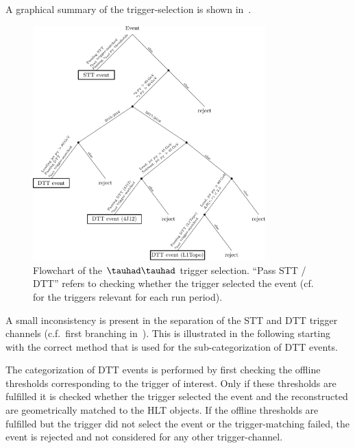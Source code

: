 A graphical summary of the trigger-selection is shown in~.


\begin{figure}
  \centering
  \includegraphics[width=0.8\textwidth]{figures/selection/HadHad_HH/trigger_flowchart_hadhad}
  \caption{Flowchart of the $\tauhad\tauhad$ trigger selection. ``Pass
    STT / DTT'' refers to checking whether the trigger selected the
    event (cf.~ for the triggers relevant
    for each run period).}
  \label{fig:hadhad_trigger_flowchart}
\end{figure}

A small inconsistency is present in the separation of the STT and DTT
trigger channels (c.f.\ first branching
in~). This is illustrated in the
following starting with the correct method that is used for the
sub-categorization of DTT events.

The categorization of DTT events is performed by first checking the
offline thresholds corresponding to the trigger of interest. Only if
these thresholds are fulfilled it is checked whether the trigger
selected the event and the reconstructed \tauhad are geometrically
matched to the HLT objects. If the offline thresholds are fulfilled
but the trigger did not select the event or the trigger-matching
failed, the event is rejected and not considered for any other
trigger-channel.


